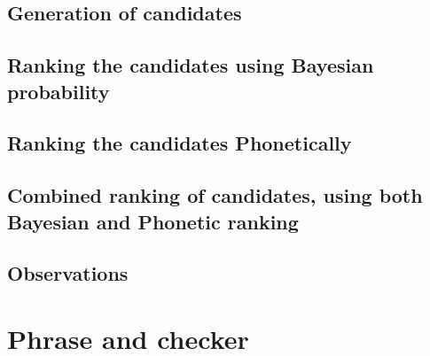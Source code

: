 \documentclass{article}
\begin{document}
		\subsection{Generation of candidates}		
		
		\subsection{Ranking the candidates using Bayesian probability}
		
		\subsection{Ranking the candidates Phonetically}
		
		\subsection{Combined ranking of candidates, using both Bayesian and Phonetic ranking}		
		
		\subsection{Observations}		
		
		
	\section{Phrase and checker}
				
		
	
\end{document}
